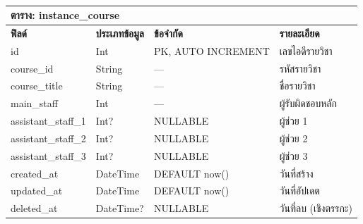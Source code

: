 \begin{table}[htbp]
    \caption{}\label{tab3:instance_course_fields}
    \centering
    \renewcommand{\arraystretch}{1.2}
    \small
    \begin{tabular}{p{} p{} p{} p{}}
        \hline
        \multicolumn{4}{l}{\textbf{ตาราง: instance\_course}} \\
        \hline
            \textbf{ฟิลด์} & \textbf{ประเภทข้อมูล} & \textbf{ข้อจำกัด} & \textbf{รายละเอียด} \\
        \hline
        id & Int & PK, AUTO INCREMENT & เลขไอดีรายวิชา \\
        course\_id & String & — & รหัสรายวิชา \\
        course\_title & String & — & ชื่อรายวิชา \\
        main\_staff & Int & — & ผู้รับผิดชอบหลัก \\
        assistant\_staff\_1 & Int? & NULLABLE & ผู้ช่วย 1 \\
        assistant\_staff\_2 & Int? & NULLABLE & ผู้ช่วย 2 \\
        assistant\_staff\_3 & Int? & NULLABLE & ผู้ช่วย 3 \\
        created\_at & DateTime & DEFAULT now() & วันที่สร้าง \\
        updated\_at & DateTime & DEFAULT now() & วันที่อัปเดต \\
        deleted\_at & DateTime? & NULLABLE & วันที่ลบ (เชิงตรรกะ) \\
        \hline
    \end{tabular}
\end{table}

